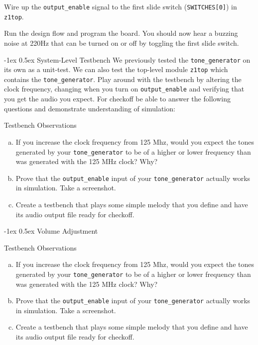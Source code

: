 \documentclass[11pt]{article}
\makeatletter
\renewcommand{\subsection}
{\@startsection {subsection}{1}{0pt}
 {-1ex}
 {0.5ex}
 {\bfseries\normalsize}}
\makeatother
\begin{document}
Wire up the \verb|output_enable| signal to the first slide switch (\verb|SWITCHES[0]|) in \verb|z1top|.

Run the design flow and program the board. You should now hear a buzzing noise at 220Hz that can be turned on or off by toggling the first slide switch.

\subsection{System-Level Testbench}
We previously tested the \verb|tone_generator| on its own as a unit-test.
We can also test the top-level module \verb|z1top| which contains the \verb|tone_generator|.
Play around with the testbench by altering the clock frequency, changing when you turn on \verb|output_enable| and verifying that you get the audio you expect. For checkoff be able to answer the following questions and demonstrate understanding of simulation:

\begin{texexptitled}{Testbench Observations}{}
  \begin{enumerate}[a)]
    \item If you increase the clock frequency from 125 Mhz, would you expect the tones generated by your \verb|tone_generator| to be of a higher or lower frequency than was generated with the 125 MHz clock? Why?
    \item Prove that the \verb|output_enable| input of your \verb|tone_generator| actually works in simulation. Take a screenshot.
    \item Create a testbench that plays some simple melody that you define and have its audio output file ready for checkoff.
  \end{enumerate}
\end{texexptitled}

\subsection{Volume Adjustment}

\begin{texexptitled}{Testbench Observations}{}
  \begin{enumerate}[a)]
    \item If you increase the clock frequency from 125 Mhz, would you expect the tones generated by your \verb|tone_generator| to be of a higher or lower frequency than was generated with the 125 MHz clock? Why?
    \item Prove that the \verb|output_enable| input of your \verb|tone_generator| actually works in simulation. Take a screenshot.
    \item Create a testbench that plays some simple melody that you define and have its audio output file ready for checkoff.
  \end{enumerate}
\end{texexptitled}
\end{document}
